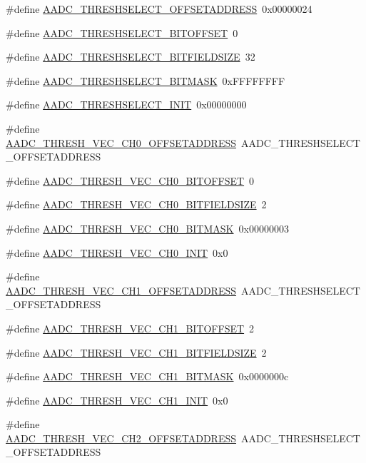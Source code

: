 \begin{DoxyCompactItemize}
\item 
\#define \hyperlink{a00543_a57a748e916ba4d92d66ce413127d1295}{AADC\_\-THRESHSELECT\_\-OFFSETADDRESS}~0x00000024
\item 
\#define \hyperlink{a00543_aebda3786dfe1b9789df6bbef00a59b7f}{AADC\_\-THRESHSELECT\_\-BITOFFSET}~0
\item 
\#define \hyperlink{a00543_a213b2581c1a996772eb0fd37f347b56a}{AADC\_\-THRESHSELECT\_\-BITFIELDSIZE}~32
\item 
\#define \hyperlink{a00543_ab6069967482975f2e3f386cf46851fb2}{AADC\_\-THRESHSELECT\_\-BITMASK}~0xFFFFFFFF
\item 
\#define \hyperlink{a00543_add6191da8c1d764e3cfdbbdaed36a92b}{AADC\_\-THRESHSELECT\_\-INIT}~0x00000000
\item 
\#define \hyperlink{a00543_aa8c7c47367ab14732fce5ab554419f53}{AADC\_\-THRESH\_\-VEC\_\-CH0\_\-OFFSETADDRESS}~AADC\_\-THRESHSELECT\_\-OFFSETADDRESS
\item 
\#define \hyperlink{a00543_a7d37dc40a4d9111456c29979ba17fba2}{AADC\_\-THRESH\_\-VEC\_\-CH0\_\-BITOFFSET}~0
\item 
\#define \hyperlink{a00543_a02e9913e7904419cd930d814cd8908c5}{AADC\_\-THRESH\_\-VEC\_\-CH0\_\-BITFIELDSIZE}~2
\item 
\#define \hyperlink{a00543_af95b9a4a3e0d9d4d0e82150aa280d607}{AADC\_\-THRESH\_\-VEC\_\-CH0\_\-BITMASK}~0x00000003
\item 
\#define \hyperlink{a00543_a245165de880ff688fcc0aa814e58b8db}{AADC\_\-THRESH\_\-VEC\_\-CH0\_\-INIT}~0x0
\item 
\#define \hyperlink{a00543_aea87f179e46d020d175219b3bc160db2}{AADC\_\-THRESH\_\-VEC\_\-CH1\_\-OFFSETADDRESS}~AADC\_\-THRESHSELECT\_\-OFFSETADDRESS
\item 
\#define \hyperlink{a00543_a56cceb0e3049be18b01724768dc6d405}{AADC\_\-THRESH\_\-VEC\_\-CH1\_\-BITOFFSET}~2
\item 
\#define \hyperlink{a00543_ab829c96cad77352420e4c72cb5ba22dd}{AADC\_\-THRESH\_\-VEC\_\-CH1\_\-BITFIELDSIZE}~2
\item 
\#define \hyperlink{a00543_a750d6c28045fd5ac2a489c6fe29eda0a}{AADC\_\-THRESH\_\-VEC\_\-CH1\_\-BITMASK}~0x0000000c
\item 
\#define \hyperlink{a00543_a4a98721256b7e3c91a62eeb5a99d5bd5}{AADC\_\-THRESH\_\-VEC\_\-CH1\_\-INIT}~0x0
\item 
\#define \hyperlink{a00543_a192ec90d95b0d0a1fba1fa923763dbfa}{AADC\_\-THRESH\_\-VEC\_\-CH2\_\-OFFSETADDRESS}~AADC\_\-THRESHSELECT\_\-OFFSETADDRESS
\item 

\end{DoxyCompactItemize}
